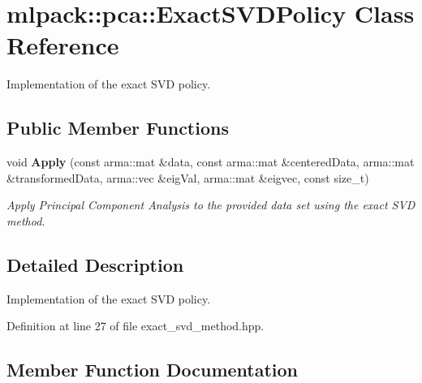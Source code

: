 \section{mlpack\+:\+:pca\+:\+:Exact\+S\+V\+D\+Policy Class Reference}
\label{classmlpack_1_1pca_1_1ExactSVDPolicy}


Implementation of the exact S\+VD policy.  


\subsection*{Public Member Functions}
\begin{DoxyCompactItemize}
\item 
void {\bf Apply} (const arma\+::mat \&data, const arma\+::mat \&centered\+Data, arma\+::mat \&transformed\+Data, arma\+::vec \&eig\+Val, arma\+::mat \&eigvec, const size\+\_\+t)
\begin{DoxyCompactList}\small\item\em Apply Principal Component Analysis to the provided data set using the exact S\+VD method. \end{DoxyCompactList}\end{DoxyCompactItemize}


\subsection{Detailed Description}
Implementation of the exact S\+VD policy. 

Definition at line 27 of file exact\+\_\+svd\+\_\+method.\+hpp.



\subsection{Member Function Documentation}
